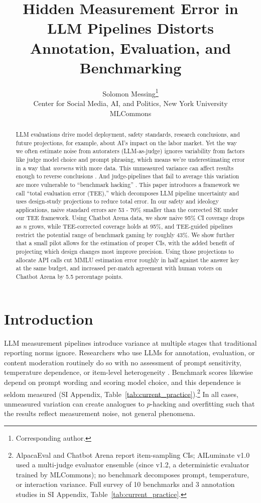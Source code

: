 \documentclass{article}
\title{Hidden Measurement Error in LLM Pipelines Distorts Annotation, Evaluation, and Benchmarking}
\author{%
  Solomon Messing\thanks{Corresponding author.} \\
  Center for Social Media, AI, and Politics, New York University \\
  MLCommons \\
}
\begin{document}
\maketitle

\begin{abstract}
LLM evaluations drive model deployment, safety standards, research conclusions, and future projections, for example, about AI's impact on the labor market. Yet the way we often estimate noise from autoraters (LLM-as-judge) ignores variability from factors like judge model choice and prompt phrasing, which means we're underestimating error in a way that \emph{worsens} with more data. This unmeasured variance can affect results enough to reverse conclusions \citep{baumann2025llmhacking, huang2026dropping}. And judge-pipelines that fail to average this variation are more vulnerable to ``benchmark hacking'' \citep{singh2025leaderboard}. This paper introduces a framework we call ``total evaluation error (TEE),'' which decomposes LLM pipeline uncertainty and uses design-study projections to reduce total error. In our safety and ideology applications, naive standard errors are 53 - 70\% smaller than the corrected SE under our TEE framework. Using Chatbot Arena data, we show naive 95\% CI coverage drops as $n$ grows, while TEE-corrected coverage holds at 95\%, and TEE-guided pipelines restrict the potential range of benchmark gaming by roughly 43\%. We show further that a small pilot allows for the estimation of proper CIs, with the added benefit of projecting which design changes most improve precision. Using those projections to allocate API calls cut MMLU estimation error roughly in half against the answer key at the same budget, and increased per-match agreement with human voters on Chatbot Arena by 5.5 percentage points.
\end{abstract}

\section{Introduction}
\label{sec:intro}

LLM measurement pipelines introduce variance at multiple stages that traditional reporting norms ignore. Researchers who use LLMs for annotation, evaluation, or content moderation routinely do so with no assessment of prompt sensitivity, temperature dependence, or item-level heterogeneity \citep{pecher2026underspecification, barrie2025replication}. Benchmark scores likewise depend on prompt wording and scoring model choice, and this dependence is seldom measured (SI Appendix, Table~\ref{tab:current_practice}).\footnote{AlpacaEval and Chatbot Arena report item-sampling CIs; AILuminate v1.0 used a multi-judge evaluator ensemble (since v1.2, a deterministic evaluator trained by MLCommons); no benchmark decomposes prompt, temperature, or interaction variance. Full survey of 10 benchmarks and 3 annotation studies in SI Appendix, Table~\ref{tab:current_practice}.} In all cases, unmeasured variation can create analogues to $p$-hacking \citep{simmons2011falsepositive, gelman2013garden} and overfitting \citep{recht2019imagenet} such that the results reflect measurement noise, not general phenomena.
\end{document}
